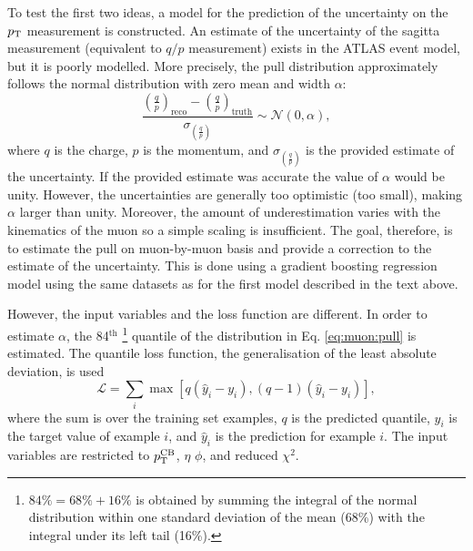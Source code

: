 To test the first two ideas, a model for the prediction of the uncertainty
on the $p_{\text{T}}$ measurement is constructed. An estimate of the uncertainty
of the sagitta measurement (equivalent to $q/p$ measurement) exists in the
ATLAS event model, but it is poorly modelled. More precisely, the
pull distribution approximately follows the normal distribution with
zero mean and width $\alpha$:
\begin{equation}
\frac{\left(\frac{q}{p}\right)_\text{reco}
- \left(\frac{q}{p}\right)_\text{truth}}
{\sigma_{\left(\frac{q}{p}\right)}}
\sim \mathcal{N}(0, \alpha),
\label{eq:muon:pull}
\end{equation}
where $q$ is the charge, $p$ is the momentum, and
$\sigma_{\left(\frac{q}{p}\right)}$ is the provided estimate of the
uncertainty. If the provided estimate was accurate the value of $\alpha$
would be unity. However, the uncertainties are generally too optimistic (too
small), making $\alpha$ larger than unity. Moreover, the amount of underestimation varies with
the kinematics of the muon so a simple scaling is insufficient.
The goal, therefore, is to estimate
the pull on muon-by-muon basis and provide a correction to the estimate
of the uncertainty. This is done using a gradient boosting regression model
using the same datasets as for the first model described in the text above.

However, the input variables and the loss function are different. In order
to estimate $\alpha$, the 84$^\text{th}$ \footnote{$84\% = 68\% + 16\%$ is obtained
by summing the integral of the normal distribution within one standard deviation
of the mean (68\%) with the integral under its left tail (16\%).}
quantile of the
distribution in Eq. \ref{eq:muon:pull} is estimated. The quantile loss
function, the generalisation of the least absolute deviation, is used \cite{qreg}
\begin{equation}
\mathcal{L} = \sum_{i}\max \left[ q (\hat{y}_i - y_i), (q-1)(\hat{y}_i - y_i)\right],
\end{equation}
where the sum is over the training set examples, $q$ is the predicted quantile,
$y_i$ is the target value of example $i$, and $\hat{y}_i$ is the prediction
for example $i$. The input variables are restricted to $p_{\text{T}}^\text{CB}$, $\eta$
$\phi$, and reduced $\chi^2$.


